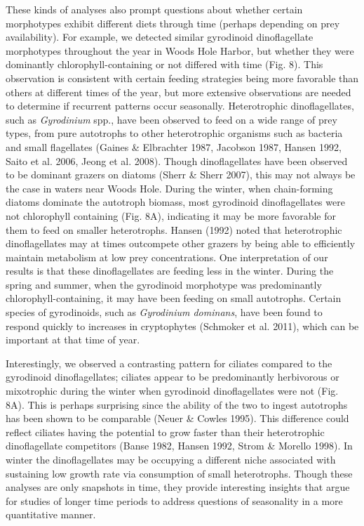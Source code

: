 These kinds of analyses also prompt questions about whether certain morphotypes exhibit different
diets through time (perhaps depending on prey availability). For example, we detected similar gyrodinoid dinoflagellate morphotypes throughout the year in Woods Hole Harbor, but whether they were dominantly chlorophyll-containing or not differed with time (Fig. 8). This observation is consistent with certain feeding strategies being more favorable than others at different times of the year, but more extensive observations are needed to determine if recurrent patterns occur seasonally. Heterotrophic dinoflagellates, such as \textit{Gyrodinium} spp., have been observed to feed on a wide range of prey types, from pure autotrophs to other heterotrophic organisms such as bacteria and small flagellates (Gaines \& Elbrachter 1987, Jacobson 1987, Hansen 1992, Saito et al. 2006, Jeong et al. 2008). Though dinoflagellates have been observed to be dominant grazers on diatoms (Sherr \& Sherr 2007), this may not always be the case in waters near Woods Hole. During the winter, when chain-forming diatoms dominate the autotroph biomass, most gyrodinoid dinoflagellates were not chlorophyll containing (Fig. 8A), indicating it may be more favorable for them to feed on smaller heterotrophs. Hansen (1992) noted that heterotrophic dinoflagellates may at times outcompete other grazers by being able to efficiently maintain metabolism at low prey concentrations. One interpretation of our results is that these dinoflagellates are feeding less in the winter. During the spring and summer, when the gyrodinoid morphotype was predominantly chlorophyll-containing, it may have been feeding on small autotrophs. Certain species of gyrodinoids, such as \textit{Gyrodinium dominans}, have been found to respond quickly to increases in cryptophytes (Schmoker et al. 2011), which can be important at that time of year.

Interestingly, we observed a contrasting pattern for ciliates compared to the gyrodinoid dinoflagellates; ciliates appear to be predominantly herbivorous or mixotrophic during the winter when gyrodinoid dinoflagellates were not (Fig. 8A). This is perhaps surprising since the ability of the two to ingest autotrophs has been shown to be comparable (Neuer \& Cowles 1995). This difference could reflect ciliates having the potential to grow faster than their heterotrophic dinoflagellate competitors (Banse 1982, Hansen 1992, Strom \& Morello 1998). In winter the dinoflagellates may be occupying a different niche associated with sustaining low growth rate via consumption of small heterotrophs. Though these analyses are only snapshots in time, they provide interesting insights that argue for studies of longer time periods to address questions of seasonality in a more quantitative manner.


